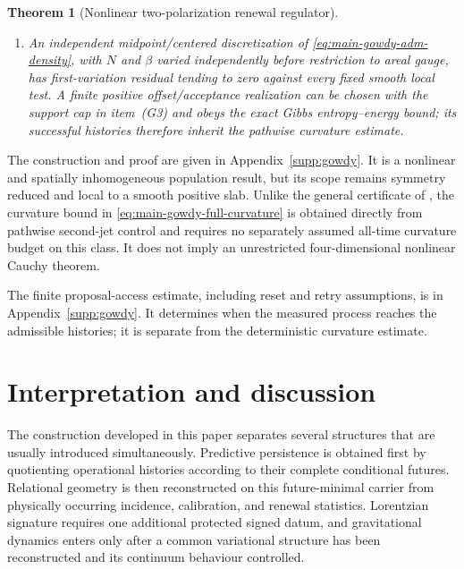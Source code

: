 \documentclass[11pt]{article}
\newtheorem{theorem}{Theorem}[section]
\numberwithin{equation}{section}
\theoremstyle{definition}
\theoremstyle{remark}
\begin{document}
\begin{theorem}[Nonlinear two-polarization renewal regulator]
\begin{enumerate}[label=\textup{(G\arabic*)},leftmargin=3em]
\begin{equation}
       \le Ch,
       \label{eq:main-gowdy-full-curvature}
      \end{equation}
      where the first term is in fact $O(h^2)$.  Thus
      $\sup_h\|\operatorname{Riem}(g_h)\|_{L^2(K)}<\infty$ and
      $\|\operatorname{Ric}(g_h)\|_{L^\infty(K)}\le Ch$ pathwise.  The
      Levi--Civita curvature of the limiting metric is therefore identified
      directly.
\item An independent midpoint/centered discretization of
      \eqref{eq:main-gowdy-adm-density}, with $N$ and $\beta$ varied
      independently before restriction to areal gauge, has first-variation
      residual tending to zero against every fixed smooth local test.  A finite
      positive offset/acceptance realization can be chosen with the support cap
      in item~\textup{(G3)} and obeys the exact Gibbs entropy--energy bound; its
      successful histories therefore inherit the pathwise curvature estimate.
\end{enumerate}
\end{theorem}

The construction and proof are given in Appendix~\ref{supp:gowdy}.  It is a
nonlinear and spatially inhomogeneous population result, but its scope remains
symmetry reduced and local to a smooth positive slab.  Unlike the general
certificate of , the curvature bound in
\eqref{eq:main-gowdy-full-curvature} is obtained directly from pathwise
second-jet control and requires no separately assumed all-time curvature budget
on this class.  It does not imply an unrestricted four-dimensional nonlinear
Cauchy theorem.


The finite proposal-access estimate, including reset and retry assumptions,
is  in Appendix~\ref{supp:gowdy}. It determines
when the measured process reaches the admissible histories; it is separate
from the deterministic curvature estimate.


\section{Interpretation and discussion}
\label{sec:discussion}

The construction developed in this paper separates several structures that
are usually introduced simultaneously.  Predictive persistence is obtained
first by quotienting operational histories according to their complete
conditional futures.  Relational geometry is then reconstructed on this
future-minimal carrier from physically occurring incidence, calibration, and
renewal statistics.  Lorentzian signature requires one additional protected
signed datum, and gravitational dynamics enters only after a common
variational structure has been reconstructed and its continuum behaviour
controlled.
\end{document}

